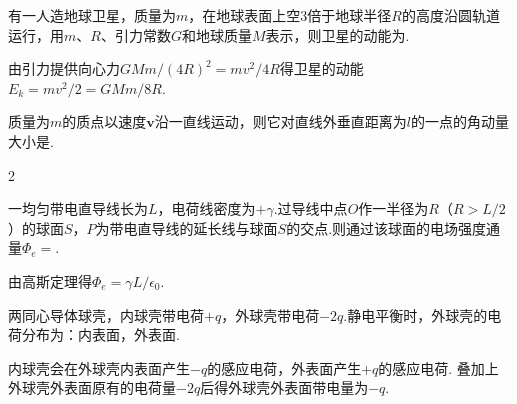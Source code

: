 \begin{problem}
    有一人造地球卫星，质量为$m$，在地球表面上空$3$倍于地球半径$R$的高度沿圆轨道运行，用$m$、$R$、引力常数$G$和地球质量$M$表示，则卫星的动能为.
\end{problem}
\begin{solution}
    由引力提供向心力$GMm/(4R)^2=mv^2/4R$得卫星的动能$E_k=mv^2/2=GMm/8R$.
\end{solution}

\begin{problem}
    质量为$m$的质点以速度$\bm v$沿一直线运动，则它对直线外垂直距离为$l$的一点的角动量大小是.
\end{problem}

\begin{paracol}{2}
\begin{problem} %
    一均匀带电直导线长为$L$，电荷线密度为$+\gamma$.过导线中点$O$作一半径为$R$（$R>L/2$）的球面$S$，$P$为带电直导线的延长线与球面$S$的交点.则通过该球面的电场强度通量$\Phi_e=$.
    \switchcolumn\vspace*{\fill}\centering
    \vspace*{\fill}
\end{problem}
\switchcolumn
\begin{solution}
    由高斯定理得$\Phi_e=\gamma L/\epsilon_0$.
\end{solution}
\end{paracol}

\begin{problem}
    两同心导体球壳，内球壳带电荷$+q$，外球壳带电荷$-2q$.静电平衡时，外球壳的电荷分布为：内表面，外表面.
\end{problem}
\begin{solution}
    内球壳会在外球壳内表面产生$-q$的感应电荷，外表面产生$+q$的感应电荷. 叠加上外球壳外表面原有的电荷量$-2q$后得外球壳外表面带电量为$-q$.
\end{solution}


